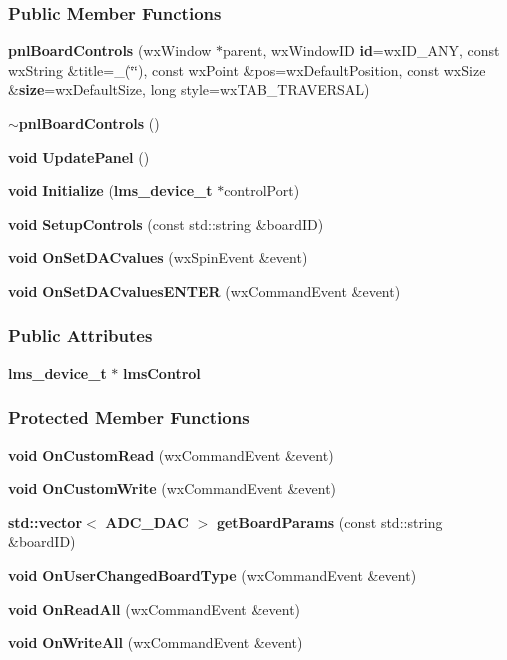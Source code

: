 \subsubsection*{Public Member Functions}
\begin{DoxyCompactItemize}
\item 
{\bf pnl\+Board\+Controls} (wx\+Window $\ast$parent, wx\+Window\+ID {\bf id}=wx\+I\+D\+\_\+\+A\+NY, const wx\+String \&title=\+\_\+(\char`\"{}\char`\"{}), const wx\+Point \&pos=wx\+Default\+Position, const wx\+Size \&{\bf size}=wx\+Default\+Size, long style=wx\+T\+A\+B\+\_\+\+T\+R\+A\+V\+E\+R\+S\+AL)
\item 
{\bf $\sim$pnl\+Board\+Controls} ()
\item 
{\bf void} {\bf Update\+Panel} ()
\item 
{\bf void} {\bf Initialize} ({\bf lms\+\_\+device\+\_\+t} $\ast$control\+Port)
\item 
{\bf void} {\bf Setup\+Controls} (const std\+::string \&board\+ID)
\item 
{\bf void} {\bf On\+Set\+D\+A\+Cvalues} (wx\+Spin\+Event \&event)
\item 
{\bf void} {\bf On\+Set\+D\+A\+Cvalues\+E\+N\+T\+ER} (wx\+Command\+Event \&event)
\end{DoxyCompactItemize}
\subsubsection*{Public Attributes}
\begin{DoxyCompactItemize}
\item 
{\bf lms\+\_\+device\+\_\+t} $\ast$ {\bf lms\+Control}
\end{DoxyCompactItemize}
\subsubsection*{Protected Member Functions}
\begin{DoxyCompactItemize}
\item 
{\bf void} {\bf On\+Custom\+Read} (wx\+Command\+Event \&event)
\item 
{\bf void} {\bf On\+Custom\+Write} (wx\+Command\+Event \&event)
\item 
{\bf std\+::vector}$<$ {\bf A\+D\+C\+\_\+\+D\+AC} $>$ {\bf get\+Board\+Params} (const std\+::string \&board\+ID)
\item 
{\bf void} {\bf On\+User\+Changed\+Board\+Type} (wx\+Command\+Event \&event)
\item 
{\bf void} {\bf On\+Read\+All} (wx\+Command\+Event \&event)
\item 
{\bf void} {\bf On\+Write\+All} (wx\+Command\+Event \&event)
\end{DoxyCompactItemize}
